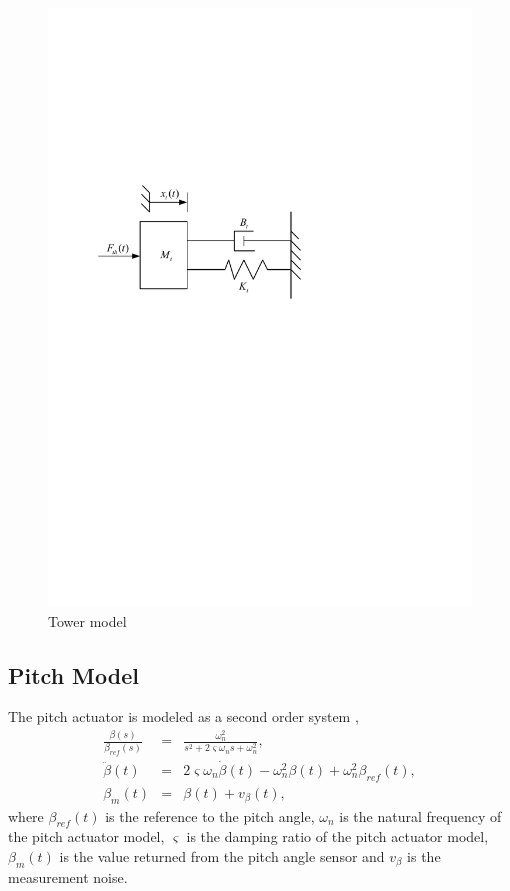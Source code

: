 \begin{figure}[!thb]
  \centering
  \includegraphics[width=0.8\hsize]{Visio-damping.pdf}
  \caption{Tower model}
  \label{fig:damping}
\end{figure}

\subsection{Pitch Model}

The pitch actuator is modeled as a second order system \cite{ref:15},
\begin{eqnarray}
  \frac{\beta(s)}{\beta_{ref}(s)} &=& \frac{\omega_n^2}{s^2+2\varsigma\omega_n{}s + \omega_n^2}, \\
  \ddot{\beta}(t) &=& 2\varsigma\omega_n\dot{\beta}(t) - \omega_n^2\beta(t) + \omega_n^2\beta_{ref}(t), \\
  \beta_m(t) &=& \beta(t) + v_\beta(t),
\end{eqnarray}
where $\beta_{ref}(t)$  is the reference to the pitch angle,
$\omega_n$ is the natural frequency of the pitch actuator model,
$\varsigma$ is the damping ratio of the pitch actuator model,
$\beta_m(t)$ is the value returned from the pitch angle sensor
and  $v_\beta$ is the measurement noise.

